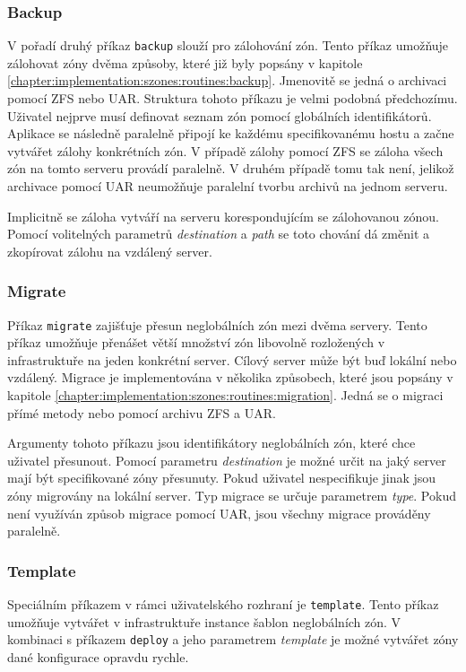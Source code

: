\subsubsection{Backup}
\label{chapter:implementation:client:cli:backup}
V pořadí druhý příkaz \verb|backup| slouží pro zálohování zón. Tento příkaz umožňuje zálohovat zóny dvěma způsoby, které již
byly popsány v kapitole \ref{chapter:implementation:szones:routines:backup}. Jmenovitě se jedná o archivaci pomocí ZFS nebo UAR.
Struktura tohoto příkazu je velmi podobná předchozímu. Uživatel nejprve musí definovat seznam zón pomocí globálních
identifikátorů. Aplikace se následně paralelně připojí ke každému specifikovanému hostu a začne vytvářet zálohy konkrétních zón. 
V případě zálohy pomocí ZFS se záloha všech zón na tomto serveru provádí paralelně. V druhém případě tomu tak není, jelikož 
archivace pomocí UAR neumožňuje paralelní tvorbu archivů na jednom serveru.

Implicitně se záloha vytváří na serveru korespondujícím se zálohovanou zónou. Pomocí volitelných parametrů \textit{destination}
a \textit{path} se toto chování dá změnit a zkopírovat zálohu na vzdálený server.
\subsubsection{Migrate}
\label{chapter:implementation:client:cli:migrate}
Příkaz \verb|migrate| zajišťuje přesun neglobálních zón mezi dvěma servery. Tento příkaz umožňuje přenášet větší množství zón
libovolně rozložených v infrastruktuře na jeden konkrétní server. Cílový server může být buď lokální nebo vzdálený. Migrace
je implementována v několika způsobech, které jsou popsány v kapitole \ref{chapter:implementation:szones:routines:migration}.
Jedná se o migraci přímé metody nebo pomocí archivu ZFS a UAR.

Argumenty tohoto příkazu jsou identifikátory neglobálních zón, které chce uživatel přesunout. Pomocí parametru \textit{destination}
je možné určit na jaký server mají být specifikované zóny přesunuty. Pokud uživatel nespecifikuje jinak jsou zóny migrovány
na lokální server. Typ migrace se určuje parametrem \textit{type}. Pokud není využíván způsob migrace pomocí UAR, jsou všechny
migrace prováděny paralelně.
\subsubsection{Template}
\label{chapter:implementation:client:cli:template}
Speciálním příkazem v rámci uživatelského rozhraní je \verb|template|. Tento příkaz umožňuje vytvářet v infrastruktuře instance
šablon neglobálních zón. V kombinaci s příkazem \verb|deploy| a jeho parametrem \textit{template} je možné vytvářet zóny
dané konfigurace opravdu rychle.

